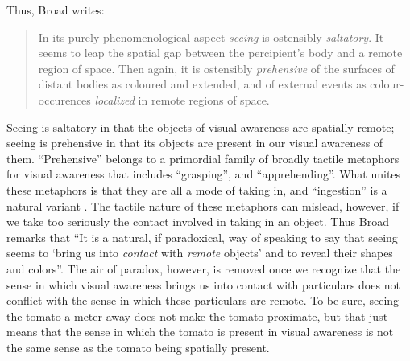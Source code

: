 \documentclass[12pt]{article}
\begin{document}
Thus, Broad writes:
\begin{quote}
    In its purely phenomenological aspect \emph{seeing} is ostensibly \emph{saltatory}. It seems to leap the spatial gap between the percipient's body and a remote region of space. Then again, it is ostensibly \emph{prehensive} of the surfaces of distant bodies as coloured and extended, and of external events as colour-occurences \emph{localized} in remote regions of space. \citep[32]{Broad:1965dq}
\end{quote}
Seeing is saltatory in that the objects of visual awareness are spatially remote; seeing is prehensive in that its objects are present in our visual awareness of them. ``Prehensive'' belongs to a primordial family of broadly tactile metaphors for visual awareness that includes ``grasping'', and ``apprehending''. What unites these metaphors is that they are all a mode of taking in, and ``ingestion'' is a natural variant \citep[see][7]{Johnston:2006uq,Price:1932fk}. The tactile nature of these metaphors can mislead, however, if we take too seriously the contact involved in taking in an object. Thus Broad remarks that ``It is a natural, if paradoxical, way of speaking to say that seeing seems to `bring us into \emph{contact} with \emph{remote} objects' and to reveal their shapes and colors''. The air of paradox, however, is removed once we recognize that the sense in which visual awareness brings us into contact with particulars does not conflict with the sense in which these particulars are remote. To be sure, seeing the tomato a meter away does not make the tomato proximate, but that just means that the sense in which the tomato is present in visual awareness is not the same sense as the tomato being spatially present.
\end{document}
